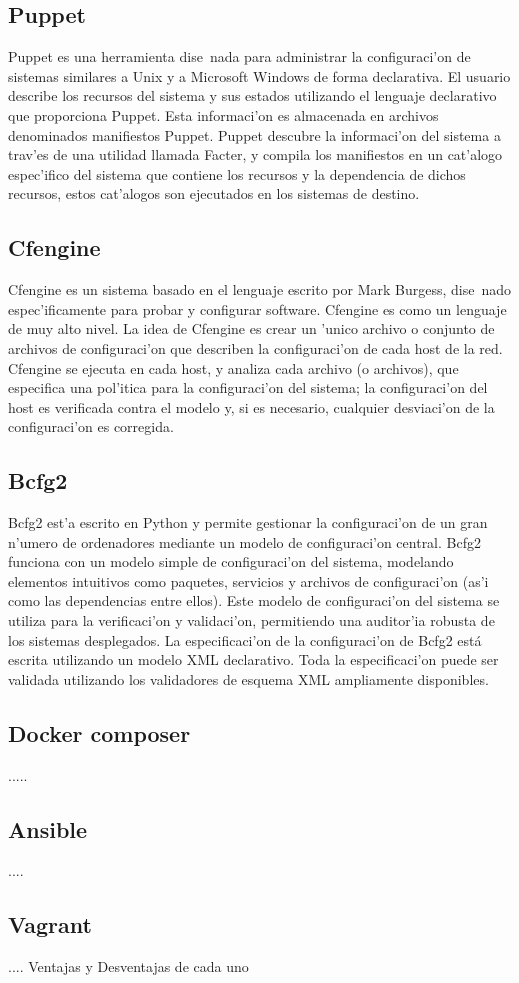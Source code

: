 \subsection{Puppet}
Puppet es una herramienta dise~nada para administrar la configuraci'on de sistemas similares a Unix y a Microsoft Windows de forma declarativa. El usuario describe los recursos del sistema y sus estados utilizando el lenguaje declarativo que proporciona Puppet. Esta informaci'on es almacenada en archivos denominados manifiestos Puppet. Puppet descubre la informaci'on del sistema a trav'es de una utilidad llamada Facter, y compila los manifiestos en un cat'alogo espec'ifico del sistema que contiene los recursos y la dependencia de dichos recursos, estos cat'alogos son ejecutados en los sistemas de destino. \cite{Pupet15}

\subsection{Cfengine}
Cfengine es un sistema basado en el lenguaje escrito por Mark Burgess, dise~nado espec'ificamente para probar y configurar software. Cfengine es como un lenguaje de muy alto nivel. La idea de Cfengine es crear un 'unico archivo o conjunto de archivos de configuraci'on que describen la configuraci'on de cada host de la red. Cfengine se ejecuta en cada host, y analiza cada archivo (o archivos), que especifica una pol'itica para la configuraci'on del sistema; la configuraci'on del host es verificada contra el modelo y, si es necesario, cualquier desviaci'on de la configuraci'on es corregida. \cite{cfengine15}

\subsection{Bcfg2}
Bcfg2 est'a escrito en Python y permite gestionar la configuraci'on de un gran n'umero de ordenadores mediante un modelo de configuraci'on central. Bcfg2 funciona con un modelo simple de configuraci'on del sistema, modelando elementos intuitivos como paquetes, servicios y archivos de configuraci'on (as'i como las dependencias entre ellos). Este modelo de configuraci'on del sistema se utiliza para la verificaci'on  y validaci'on, permitiendo una auditor'ia robusta de los sistemas desplegados. La especificaci'on de la configuraci'on de Bcfg2 está escrita utilizando un modelo XML declarativo. Toda la especificaci'on puede ser validada utilizando los validadores de esquema XML ampliamente disponibles. \cite{bdfg215}

\subsection{Docker composer}
.....

\subsection{Ansible}
....

\subsection{Vagrant}
....
Ventajas y Desventajas de cada uno